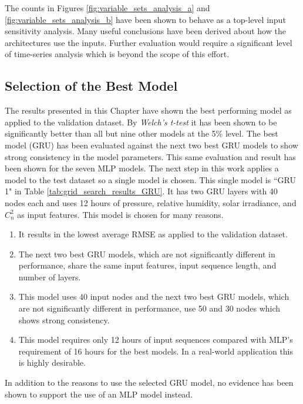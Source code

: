 The counts in Figures \ref{fig:variable_sets_analysis_a} and \ref{fig:variable_sets_analysis_b} have been shown to behave as a top-level input sensitivity analysis. Many useful conclusions have been derived about how the architectures use the inputs. Further evaluation would require a significant level of time-series analysis which is beyond the scope of this effort.

\subsection{Selection of the Best Model}
The results presented in this Chapter have shown the best performing model as applied to the validation dataset. By \textit{Welch's t-test} it has been shown to be significantly better than all but nine other models at the 5\% level. The best model (GRU) has been evaluated against the next two best GRU models to show strong consistency in the model parameters. This same evaluation and result has been shown for the seven MLP models. The next step in this work applies a model to the test dataset so a single model is chosen. This single model is ``GRU 1" in Table \ref{tab:grid_search_results_GRU}. It has two GRU layers with 40 nodes each and uses 12 hours of pressure, relative humidity, solar irradiance, and $C_{n}^{2}$ as input features. This model is chosen for many reasons.
\begin{enumerate}
	\item It results in the lowest average RMSE as applied to the validation dataset.
	\item The next two best GRU models, which are not significantly different in performance, share the same input features, input sequence length, and number of layers.
	\item This model uses 40 input nodes and the next two best GRU models, which are not significantly different in performance, use 50 and 30 nodes which shows strong consistency.
	\item This model requires only 12 hours of input sequences compared with MLP's requirement of 16 hours for the best models. In a real-world application this is highly desirable.
\end{enumerate}
In addition to the reasons to use the selected GRU model, no evidence has been shown to support the use of an MLP model instead.